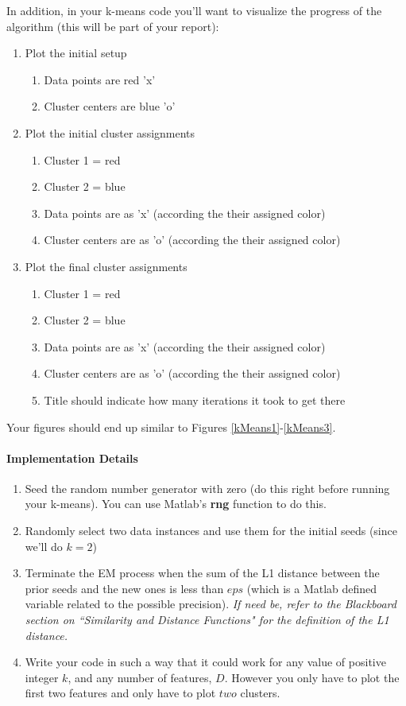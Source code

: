 \documentclass[12pt]{article}
\begin{document}
\noindent
In addition, in your k-means code you'll want to visualize the progress of the algorithm (this will be part of your report):
\begin{enumerate}
\item Plot the initial setup
    \begin{enumerate}
    \item Data points are red 'x'
    \item Cluster centers are blue 'o'
    \end{enumerate}
\item Plot the initial cluster assignments
    \begin{enumerate}
    \item Cluster 1 = red
    \item Cluster 2 = blue
    \item Data points are as 'x' (according the their assigned color)
    \item Cluster centers are as 'o' (according the their assigned color)
    \end{enumerate}
\item Plot the final cluster assignments
    \begin{enumerate}
    \item	Cluster 1 = red
    \item	Cluster 2 = blue
    \item	Data points are as 'x' (according the their assigned color)
    \item	Cluster centers are as 'o' (according the their assigned color)
    \item	Title should indicate how many iterations it took to get there
    \end{enumerate}
\end{enumerate}


Your figures should end up similar to Figures \ref{kMeans1}-\ref{kMeans3}.

\noindent
\paragraph{Implementation Details}
\begin{enumerate}
\item Seed the random number generator with zero (do this right before running your k-means).  You can use Matlab's \textbf{rng} function to do this.
\item Randomly select two data instances and use them for the initial seeds (since we'll do $k=2$)
\item Terminate the EM process when the sum of the L1 distance between the prior seeds and the new ones is less than $eps$ (which is a Matlab defined variable related to the possible precision).  \emph{If need be, refer to the Blackboard section on ``Similarity and Distance Functions" for the definition of the L1 distance.}
\item Write your code in such a way that it could work for any value of positive integer $k$, and any number of features, $D$.  However you only have to plot the first two features and only have to plot $two$ clusters.
\end{enumerate}
\end{document}
